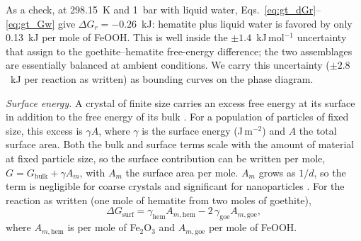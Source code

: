 As a check, at 298.15~K and 1~bar with liquid water, Eqs.~\eqref{eq:gt_dGr}--\eqref{eq:gt_Gw}
give $\Delta G_r = -0.26$~kJ: hematite plus liquid water is favored by only 0.13~kJ per mole of
FeOOH. This is well inside the $\pm1.4$~kJ\,mol$^{-1}$ uncertainty that \citet{majzlan2003}
assign to the goethite--hematite free-energy difference; the two assemblages are essentially
balanced at ambient conditions. We carry this uncertainty ($\pm2.8$~kJ per reaction as written)
as bounding curves on the phase diagram.

\textit{Surface energy.} A crystal of finite size carries an excess free energy at its
surface in addition to the free energy of its bulk \citep{gibbs1878}. For a population of
particles of fixed size, this excess is $\gamma A$, where $\gamma$ is the surface energy
(J\,m$^{-2}$) and $A$ the total surface area. Both the bulk and surface terms scale with the
amount of material at fixed particle size, so the surface contribution can be written per mole,
$G = G_{\mathrm{bulk}} + \gamma A_m$, with $A_m$ the surface area per mole. $A_m$ grows as $1/d$,
so the term is negligible for coarse crystals and significant for nanoparticles
\citep{navrotsky2008}. For the reaction as written (one mole of hematite from two moles of
goethite),
\begin{equation}
  \Delta G_{\mathrm{surf}} = \gamma_{\mathrm{hem}} A_{m,\mathrm{hem}} - 2\,\gamma_{\mathrm{goe}} A_{m,\mathrm{goe}},
  \label{eq:gt_dGsurf}
\end{equation}
where $A_{m,\mathrm{hem}}$ is per mole of Fe$_2$O$_3$ and $A_{m,\mathrm{goe}}$ per mole of FeOOH.

